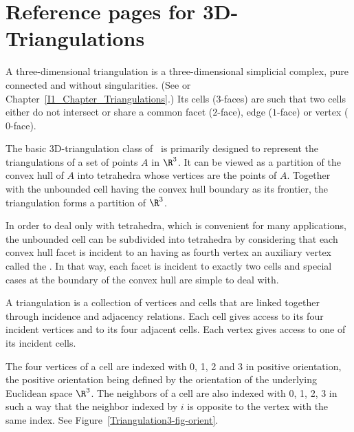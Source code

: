 
\clearpage
\section{Reference pages for 3D-Triangulations}

A three-dimensional triangulation is a three-dimensional simplicial
complex, pure connected and without singularities. (See
\cite{by-ag-98} or Chapter~\ref{I1_Chapter_Triangulations}.) Its
cells ($3$-faces) are such that two cells either do not intersect or
share a common facet ($2$-face), edge ($1$-face) or vertex ($0$-face).

The basic 3D-triangulation class of \cgal\ is primarily designed to
represent the triangulations of a set of points $A$ in $\R^3$.  It can
be viewed as a partition of the convex hull of {$A$} into tetrahedra
whose vertices are the points of {$A$}.  Together with the unbounded
cell having the convex hull boundary as its frontier, the triangulation
forms a partition of $\R^3$.

In order to deal
only with tetrahedra, which is convenient for many applications, the
unbounded cell can be subdivided into tetrahedra by considering that
each convex hull facet is incident to an  having as
fourth vertex an auxiliary vertex called the .  In
that way, each facet is incident to exactly two cells and special cases
at the boundary of the convex hull are simple to deal with.


A triangulation is a collection of vertices and cells that are linked
together through incidence and adjacency relations. Each cell gives
access to its four incident vertices and to its four adjacent
cells. Each vertex gives access to one of its incident cells.

The four vertices of a cell are indexed with 0, 1, 2 and 3 in positive
orientation, the positive orientation being defined by the orientation
of the underlying Euclidean space $\R^3$. The neighbors of a cell are also
indexed with 0, 1, 2, 3 in such a way that the neighbor indexed by $i$
is opposite to the vertex with the same index. See
Figure~\ref{Triangulation3-fig-orient}.


